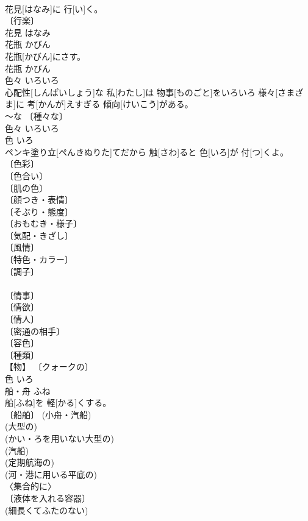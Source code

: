 \documentclass[8pt]{extreport}
\begin{document}
\begin{CJK}{UTF8}{min}
\\	花見[はなみ]に 行[い]く。	
\\	〔行楽〕 
\\	花見	はなみ	
\\	花瓶	かびん	
\\	花瓶[かびん]にさす。	
\\	花瓶	かびん	
\\	色々	いろいろ	
\\	心配性[しんぱいしょう]な 私[わたし]は 物事[ものごと]をいろいろ 様々[さまざま]に 考[かんが]えすぎる 傾向[けいこう]がある。	
\\	～な 〔種々な〕 
\\	色々	いろいろ	
\\	色	いろ	
\\	ペンキ塗り立[ぺんきぬりた]てだから 触[さわ]ると 色[いろ]が 付[つ]くよ。	
\\	〔色彩〕 
\\	〔色合い〕 
\\	〔肌の色〕 
\\	〔顔つき・表情〕 
\\	〔そぶり・態度〕 
\\	〔おもむき・様子〕 
\\	〔気配・きざし〕 
\\	〔風情〕 
\\	〔特色・カラー〕 
\\	〔調子〕 
\\	[⇒ねいろ, こわいろ] 
\\	〔情事〕 
\\	〔情欲〕 
\\	〔情人〕 
\\	〔密通の相手〕 
\\	〔容色〕 
\\	〔種類〕 
\\	【物】 〔クォークの〕 
\\	色	いろ	
\\	船・舟	ふね	
\\	船[ふね]を 軽[かる]くする。	
\\	〔船舶〕 (小舟・汽船) 
\\	(大型の) 
\\	(かい・ろを用いない大型の) 
\\	(汽船) 
\\	(定期航海の) 
\\	(河・港に用いる平底の) 
\\	〈集合的に〉 
\\	〔液体を入れる容器〕 
\\	(細長くてふたのない) 

\end{CJK}
\end{document}
